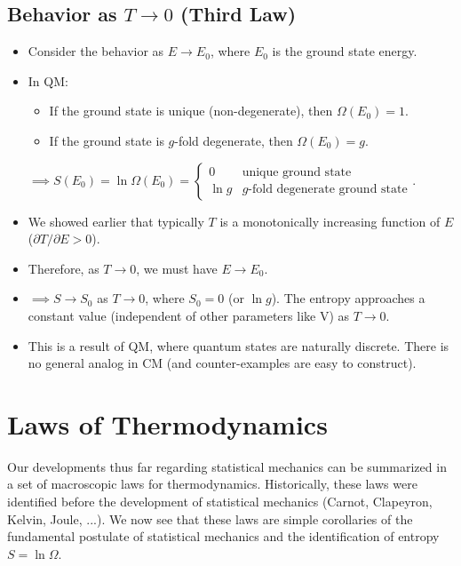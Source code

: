 \documentclass[11pt]{article}
\begin{document}
\subsection*{Behavior as $T \to 0$ (Third Law)}
\begin{itemize}
    \item Consider the behavior as $E \to E_0$, where $E_0$ is the ground state energy.
    \item In QM:
        \begin{itemize}
            \item If the ground state is unique (non-degenerate), then $\Omega(E_0) = 1$.
            \item If the ground state is $g$-fold degenerate, then $\Omega(E_0) = g$.
        \end{itemize}
        $\implies S(E_0) = \ln \Omega(E_0) = \begin{cases} 0 & \text{unique ground state} \\ \ln g & g\text{-fold degenerate ground state} \end{cases}$.
    \item We showed earlier that typically $T$ is a monotonically increasing function of $E$ ($\partial T / \partial E > 0$).
    \item Therefore, as $T \to 0$, we must have $E \to E_0$.
    \item $\implies S \to S_0$ as $T \to 0$, where $S_0 = 0$ (or $\ln g$). The entropy approaches a constant value (independent of other parameters like V) as $T \to 0$.
    \item This is a result of QM, where quantum states are naturally discrete. There is no general analog in CM (and counter-examples are easy to construct).
\end{itemize}

\section*{Laws of Thermodynamics}

Our developments thus far regarding statistical mechanics can be summarized in a set of macroscopic laws for thermodynamics. Historically, these laws were identified before the development of statistical mechanics (Carnot, Clapeyron, Kelvin, Joule, ...). We now see that these laws are simple corollaries of the fundamental postulate of statistical mechanics and the identification of entropy $S=\ln \Omega$.
\end{document}
